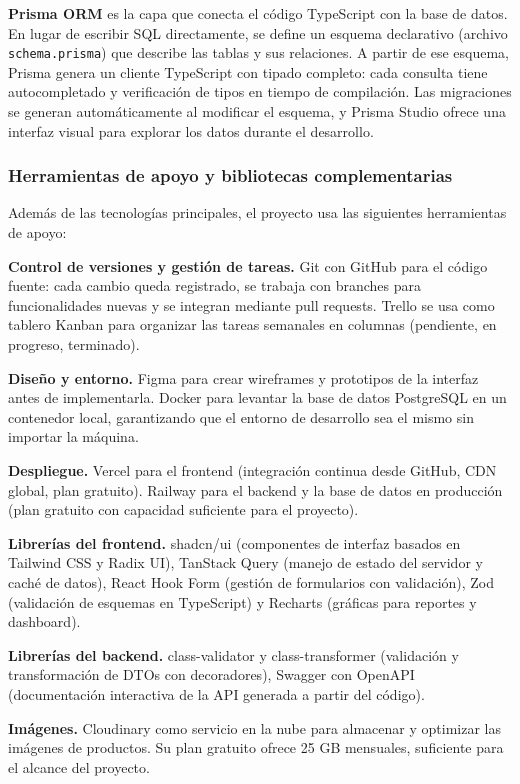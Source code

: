 \documentclass[spanish]{ieee_upb}
\begin{document}
\textbf{Prisma ORM} es la capa que conecta el código TypeScript con la base de datos. En lugar de escribir SQL directamente, se define un esquema declarativo (archivo \texttt{schema.prisma}) que describe las tablas y sus relaciones. A partir de ese esquema, Prisma genera un cliente TypeScript con tipado completo: cada consulta tiene autocompletado y verificación de tipos en tiempo de compilación. Las migraciones se generan automáticamente al modificar el esquema, y Prisma Studio ofrece una interfaz visual para explorar los datos durante el desarrollo.

\subsubsection{Herramientas de apoyo y bibliotecas complementarias}

Además de las tecnologías principales, el proyecto usa las siguientes herramientas de apoyo:

\textbf{Control de versiones y gestión de tareas.} Git con GitHub para el código fuente: cada cambio queda registrado, se trabaja con branches para funcionalidades nuevas y se integran mediante pull requests. Trello se usa como tablero Kanban para organizar las tareas semanales en columnas (pendiente, en progreso, terminado).

\textbf{Diseño y entorno.} Figma para crear wireframes y prototipos de la interfaz antes de implementarla. Docker para levantar la base de datos PostgreSQL en un contenedor local, garantizando que el entorno de desarrollo sea el mismo sin importar la máquina.

\textbf{Despliegue.} Vercel para el frontend (integración continua desde GitHub, CDN global, plan gratuito). Railway para el backend y la base de datos en producción (plan gratuito con capacidad suficiente para el proyecto).

\textbf{Librerías del frontend.} shadcn/ui (componentes de interfaz basados en Tailwind CSS y Radix UI), TanStack Query (manejo de estado del servidor y caché de datos), React Hook Form (gestión de formularios con validación), Zod (validación de esquemas en TypeScript) y Recharts (gráficas para reportes y dashboard).

\textbf{Librerías del backend.} class-validator y class-transformer (validación y transformación de DTOs con decoradores), Swagger con OpenAPI (documentación interactiva de la API generada a partir del código).

\textbf{Imágenes.} Cloudinary como servicio en la nube para almacenar y optimizar las imágenes de productos. Su plan gratuito ofrece 25 GB mensuales, suficiente para el alcance del proyecto.
\end{document}

